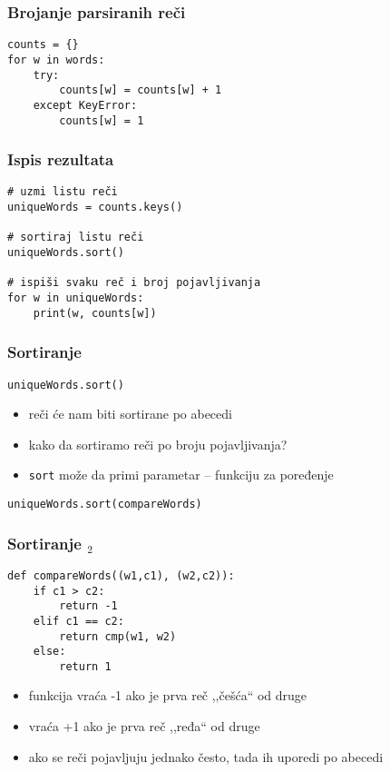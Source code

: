 \documentclass[utf8,compress]{beamer}
\begin{document}
\begin{frame}[fragile]
  \frametitle{Brojanje parsiranih reči}
\begin{verbatim}
counts = {}
for w in words:
    try:
        counts[w] = counts[w] + 1
    except KeyError:
        counts[w] = 1
\end{verbatim}
\end{frame}

\begin{frame}[fragile]
  \frametitle{Ispis rezultata}
\begin{verbatim}
# uzmi listu reči
uniqueWords = counts.keys()

# sortiraj listu reči
uniqueWords.sort()

# ispiši svaku reč i broj pojavljivanja
for w in uniqueWords:
    print(w, counts[w])
\end{verbatim}
\end{frame}

\begin{frame}[fragile]
  \frametitle{Sortiranje}
\begin{verbatim}
uniqueWords.sort()
\end{verbatim}
  \begin{itemize}
    \item reči će nam biti sortirane po abecedi
    \item kako da sortiramo reči po broju pojavljivanja?
    \item \texttt{sort} može da primi parametar -- funkciju za poređenje
  \end{itemize}
\begin{verbatim}
uniqueWords.sort(compareWords)
\end{verbatim}
\end{frame}

\begin{frame}[fragile]
  \frametitle{Sortiranje $_2$}
\begin{verbatim}
def compareWords((w1,c1), (w2,c2)):
    if c1 > c2:
        return -1
    elif c1 == c2:
        return cmp(w1, w2)
    else:
        return 1
\end{verbatim}
  \begin{itemize}
    \item funkcija vraća -1 ako je prva reč ,,češća`` od druge
    \item vraća +1 ako je prva reč ,,ređa`` od druge
    \item ako se reči pojavljuju jednako često, tada ih uporedi po abecedi
  \end{itemize}
\end{frame}
\end{document}
